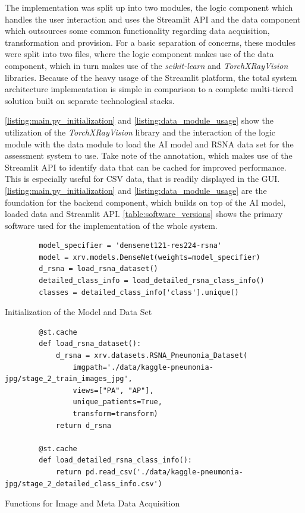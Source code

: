 \documentclass[11pt,a4paper,english]{scrreprt}
\begin{document}
The implementation was split up into two modules, the logic component which handles the user interaction and uses the Streamlit API and the data component which outsources some common functionality regarding data acquisition, transformation and provision. For a basic separation of concerns, these modules were split into two files, where the logic component makes use of the data component, which in turn makes use of the \textit{scikit-learn} and \textit{TorchXRayVision} libraries. Because of the heavy usage of the Streamlit platform, the total system architecture implementation is simple in comparison to a complete multi-tiered solution built on separate technological stacks.

\autoref{listing:main.py_initialization} and \autoref{listing:data_module_usage} show the utilization of the \textit{TorchXRayVision} library and the interaction of the logic module with the data module to load the AI model and RSNA data set for the assessment system to use. Take note of the  annotation, which makes use of the Streamlit API to identify data that can be cached for improved performance. This is especially useful for CSV data, that is readily displayed in the GUI. \autoref{listing:main.py_initialization} and \autoref{listing:data_module_usage} are the foundation for the backend component, which builds on top of the AI model, loaded data and Streamlit API. \autoref{table:software_versions} shows the primary software used for the implementation of the whole system.

\begin{listing}[htpb]
    \begin{verbatim}
        model_specifier = 'densenet121-res224-rsna'
        model = xrv.models.DenseNet(weights=model_specifier)
        d_rsna = load_rsna_dataset()
        detailed_class_info = load_detailed_rsna_class_info()
        classes = detailed_class_info['class'].unique()
    \end{verbatim}
    \caption{Initialization of the Model and Data Set}
    \label{listing:main.py_initialization}
\end{listing}

\begin{listing}[htpb]
    \begin{verbatim}
        @st.cache
        def load_rsna_dataset():
            d_rsna = xrv.datasets.RSNA_Pneumonia_Dataset(
                imgpath='./data/kaggle-pneumonia-jpg/stage_2_train_images_jpg',
                views=["PA", "AP"],
                unique_patients=True,
                transform=transform)
            return d_rsna

        @st.cache
        def load_detailed_rsna_class_info():
            return pd.read_csv('./data/kaggle-pneumonia-jpg/stage_2_detailed_class_info.csv')
    \end{verbatim}
    \caption{Functions for Image and Meta Data Acquisition}
    \label{listing:data_module_usage}
\end{listing}
\end{document}

